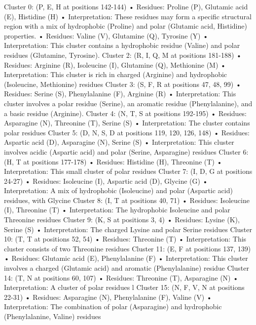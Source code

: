 \documentclass{article}
\begin{document}
    Cluster 0: (P, E, H at positions 142-144)
    • Residues: Proline (P), Glutamic acid (E), Histidine (H)
    • Interpretation: These residues may form a specific structural region with a mix of hydrophobic (Proline) and polar (Glutamic acid, Histidine) properties. 
    • Residues: Valine (V), Glutamine (Q), Tyrosine (Y)
    • Interpretation: This cluster contains a hydrophobic residue (Valine) and polar residues (Glutamine, Tyrosine). 
Cluster 2: (R, I, Q, M at positions 181-188)
    • Residues: Arginine (R), Isoleucine (I), Glutamine (Q), Methionine (M)
    • Interpretation: This cluster is rich in charged (Arginine) and hydrophobic (Isoleucine, Methionine) residues
Cluster 3: (S, F, R at positions 47, 48, 99)
    • Residues: Serine (S), Phenylalanine (F), Arginine (R)
    • Interpretation: This cluster involves a polar residue (Serine), an aromatic residue (Phenylalanine), and a basic residue (Arginine).
Cluster 4: (N, T, S at positions 192-195)
    • Residues: Asparagine (N), Threonine (T), Serine (S)
    • Interpretation: The cluster contains polar residues
Cluster 5: (D, N, S, D at positions 119, 120, 126, 148)
    • Residues: Aspartic acid (D), Asparagine (N), Serine (S)
    • Interpretation: This cluster involves acidic (Aspartic acid) and polar (Serine, Asparagine) residues
Cluster 6: (H, T at positions 177-178)
    • Residues: Histidine (H), Threonine (T)
    • Interpretation: This small cluster of polar residues 
Cluster 7: (I, D, G at positions 24-27)
    • Residues: Isoleucine (I), Aspartic acid (D), Glycine (G)
    • Interpretation: A mix of hydrophobic (Isoleucine) and polar (Aspartic acid) residues, with Glycine 
Cluster 8: (I, T at positions 40, 71)
    • Residues: Isoleucine (I), Threonine (T)
    • Interpretation: The hydrophobic Isoleucine and polar Threonine residues
Cluster 9: (K, S at positions 3, 4)
    • Residues: Lysine (K), Serine (S)
    • Interpretation: The charged Lysine and polar Serine residues
Cluster 10: (T, T at positions 52, 54)
    • Residues: Threonine (T)
    • Interpretation: This cluster consists of two Threonine residues
Cluster 11: (E, F at positions 137, 139)
    • Residues: Glutamic acid (E), Phenylalanine (F)
    • Interpretation: This cluster involves a charged (Glutamic acid) and aromatic (Phenylalanine) residue
Cluster 14: (T, N at positions 60, 107)
    • Residues: Threonine (T), Asparagine (N)
    • Interpretation: A cluster of polar residues l
Cluster 15: (N, F, V, N at positions 22-31)
    • Residues: Asparagine (N), Phenylalanine (F), Valine (V)
    • Interpretation: The combination of polar (Asparagine) and hydrophobic (Phenylalanine, Valine) residues 
\end{document}
